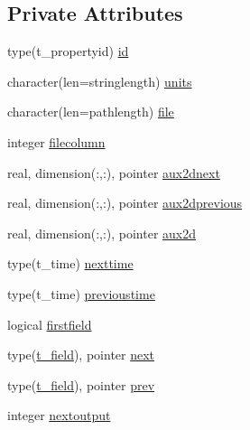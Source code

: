 \subsection*{Private Attributes}
\begin{DoxyCompactItemize}
\item 
type(t\+\_\+propertyid) \mbox{\hyperlink{structmodulecowamaasciiwind_1_1t__field_a4ac09bf7b148548c99a624617de1d47b}{id}}
\item 
character(len=stringlength) \mbox{\hyperlink{structmodulecowamaasciiwind_1_1t__field_ae1fbed5c782e77e9233a765fdfe5d3a1}{units}}
\item 
character(len=pathlength) \mbox{\hyperlink{structmodulecowamaasciiwind_1_1t__field_aa7ecf31c0615901bf8eb95329b85a70b}{file}}
\item 
integer \mbox{\hyperlink{structmodulecowamaasciiwind_1_1t__field_a41f555d5573824be0ff36ff7e77a668e}{filecolumn}}
\item 
real, dimension(\+:,\+:), pointer \mbox{\hyperlink{structmodulecowamaasciiwind_1_1t__field_ad2a9316cdca0c9e075ffa5e48c57f672}{aux2dnext}}
\item 
real, dimension(\+:,\+:), pointer \mbox{\hyperlink{structmodulecowamaasciiwind_1_1t__field_a65cab1b5d45852ab97af300f967e1a89}{aux2dprevious}}
\item 
real, dimension(\+:,\+:), pointer \mbox{\hyperlink{structmodulecowamaasciiwind_1_1t__field_a14e678ea806cfdfb240c248349c87c70}{aux2d}}
\item 
type(t\+\_\+time) \mbox{\hyperlink{structmodulecowamaasciiwind_1_1t__field_ae61490661edd5398361dda0bc53f8d1d}{nexttime}}
\item 
type(t\+\_\+time) \mbox{\hyperlink{structmodulecowamaasciiwind_1_1t__field_afff5c4fb1e6447dcc846309c1b2c3f9f}{previoustime}}
\item 
logical \mbox{\hyperlink{structmodulecowamaasciiwind_1_1t__field_a12411d1d91662ec4ef072cbebec892d7}{firstfield}}
\item 
type(\mbox{\hyperlink{structmodulecowamaasciiwind_1_1t__field}{t\+\_\+field}}), pointer \mbox{\hyperlink{structmodulecowamaasciiwind_1_1t__field_a9502bcd07aad689473ad1874ee6cadec}{next}}
\item 
type(\mbox{\hyperlink{structmodulecowamaasciiwind_1_1t__field}{t\+\_\+field}}), pointer \mbox{\hyperlink{structmodulecowamaasciiwind_1_1t__field_ac2a94947fdbc5b8832807b6a438a0935}{prev}}
\item 
integer \mbox{\hyperlink{structmodulecowamaasciiwind_1_1t__field_ad441bde8fd7337afac4b45cc9381d994}{nextoutput}}
\end{DoxyCompactItemize}


